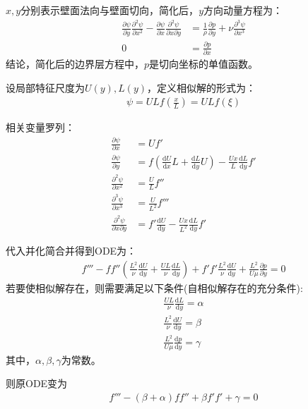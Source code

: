 $x,y$分别表示壁面法向与壁面切向，简化后，$y$方向动量方程为：
\begin{align}
    \frac{\partial \psi}{\partial y}\frac{\partial^{2} \psi}{\partial x^{2}}-\frac{\partial \psi}{\partial x}\frac{\partial^{2} \psi}{\partial x\partial y}&=\frac{1}{\rho}\frac{\partial p}{\partial y}+\nu\frac{\partial^{3} \psi}{\partial x^{3}}\\
    0&=\frac{\partial p}{\partial x}
\end{align}
结论，简化后的边界层方程中，$p$是切向坐标的单值函数。

设局部特征尺度为$U(y),L(y)$，定义相似解的形式为：
\begin{align}
    \psi=ULf(\frac{x}{L})=ULf(\xi)
\end{align}

相关变量罗列：
\begin{align}
    \frac{\partial \psi}{\partial x}&=Uf'\\
    \frac{\partial \psi}{\partial y}&=f\left(\frac{\mathrm{d}U}{\mathrm{d}x}L+\frac{\mathrm{d}L}{\mathrm{d}y}U\right)-\frac{Ux}{L}\frac{\mathrm{d}L}{\mathrm{d}y}f'\\
    \frac{\partial^{2} \psi}{\partial x^{2}}&=\frac{U}{L}f''\\
  \frac{\partial^{3} \psi}{\partial x^{3}}&=\frac{U}{L^{2}}f'''\\
      \frac{\partial^{2} \psi}{\partial x\partial y}&=f'\frac{\mathrm{d}U}{\mathrm{d}y}-\frac{Ux}{L^{2}}\frac{\mathrm{d}L}{\mathrm{d}y}f'  
\end{align}

代入并化简合并得到ODE为：
\begin{align}
    f'''-ff''\left(\frac{L^{2}}{\nu}\frac{\mathrm{d}U}{\mathrm{d}y}+\frac{UL}{\nu}\frac{\mathrm{d}L}{\mathrm{d}y}\right)+f'f'\frac{L^{2}}{\nu}\frac{\mathrm{d}U}{\mathrm{d}y}+\frac{L^{2}}{U\mu}\frac{\partial p}{\partial y}=0
\end{align}
若要使相似解存在，则需要满足以下条件(自相似解存在的充分条件):
\begin{align}
    \frac{UL}{\nu}\frac{\mathrm{d}L}{\mathrm{d}y}=\alpha\\
    \frac{L^{2}}{\nu}\frac{\mathrm{d}U}{\mathrm{d}y}=\beta\\
    \frac{L^{2}}{U\mu}\frac{\mathrm{d} p}{\mathrm{d} y}=\gamma
\end{align}
其中，$\alpha,\beta,\gamma$为常数。

则原ODE变为
\begin{align}
    \label{eq-ODE}
    f'''-(\beta+\alpha)ff''+\beta f'f'+\gamma=0
\end{align}

